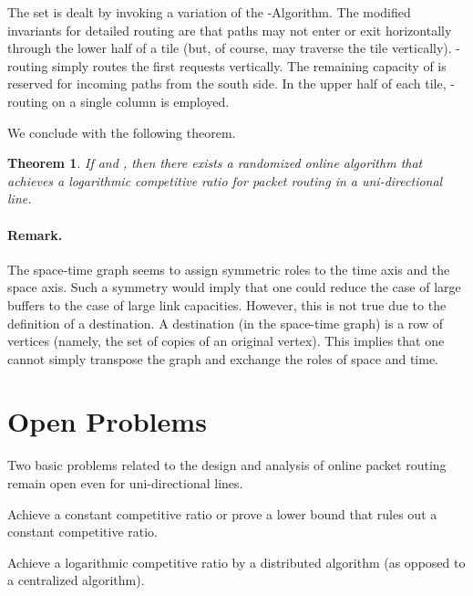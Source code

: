 \documentclass[11pt]{article}
\newtheorem{theorem}{Theorem}
\newenvironment{proof sketch}[1]{\noindent {\emph{Proof sketch of #1:}}}{\hfill \qed}
\begin{document}
The set  is dealt by invoking a variation of the
-Algorithm. The modified invariants for detailed
routing are that paths may not enter or exit horizontally
through the lower half of a tile (but, of course, may
traverse the tile vertically).  -routing simply routes
the first  requests vertically. The
remaining capacity of  is reserved for incoming
paths from the south side. In the upper half of each tile,
-routing on a single column is employed.

We conclude with the following theorem.
\begin{theorem}
  If  and , then there exists a randomized
  online algorithm that achieves a logarithmic competitive ratio for packet routing
  in a uni-directional line.
\end{theorem}


\begin{comment}
\begin{verbatim}

b<logn and n^2 > c > log n

B > m^{O(1)} and c > \log n

for the case of \section{Large Buffers \& Large Link Capacities} the requirement on c is
not required.

Superpoly B...maybe using the poly(n) pipelining?
\end{verbatim}
\end{comment}

\paragraph{Remark.}
The space-time graph seems to assign symmetric roles to the time axis and the space
axis.  Such a symmetry would imply that one could reduce the case of large buffers to
the case of large link capacities. However, this is not true due to the definition of
a destination.  A destination (in the space-time graph) is a row of
vertices (namely, the set of copies of an original vertex).
This implies that one cannot simply transpose the graph and exchange the roles of
space and time.


\section{Open Problems}
Two basic problems related to the design and analysis of
online packet routing remain open even for uni-directional
lines.
\begin{inparaenum}[(i)]
\item Achieve a constant competitive ratio or prove a lower
    bound that rules out a
  constant competitive ratio.
\item Achieve a logarithmic competitive ratio by a distributed algorithm (as opposed
  to a centralized algorithm).
\end{inparaenum}
\end{document}
